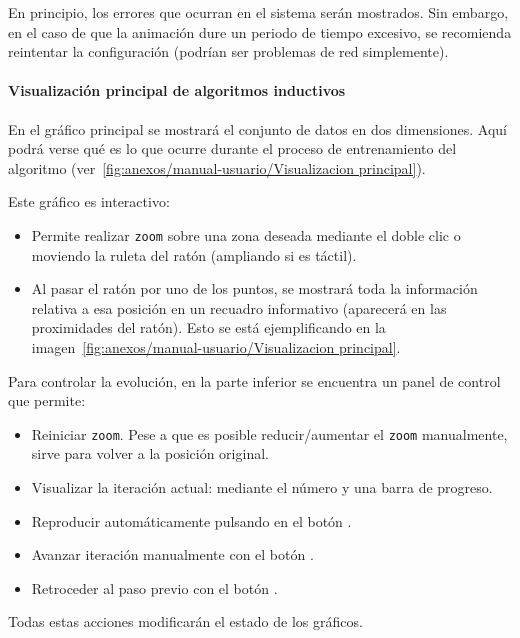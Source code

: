 En principio, los errores que ocurran en el sistema serán mostrados. Sin embargo, en el caso de que la animación dure un periodo de tiempo excesivo, se recomienda reintentar la configuración (podrían ser problemas de red simplemente).

\paragraph{Visualización principal de algoritmos inductivos} En el gráfico principal se mostrará el conjunto de datos en dos dimensiones. Aquí podrá verse qué es lo que ocurre durante el proceso de entrenamiento del algoritmo (ver~\ref{fig:anexos/manual-usuario/Visualizacion principal}).


Este gráfico es interactivo:
\begin{itemize}
    \item Permite realizar \texttt{zoom} sobre una zona deseada mediante el doble clic o moviendo la ruleta del ratón (ampliando si es táctil).
 	\item Al pasar el ratón por uno de los puntos, se mostrará toda la información relativa a esa posición en un recuadro informativo (aparecerá en las proximidades del ratón). Esto se está ejemplificando en la imagen~\ref{fig:anexos/manual-usuario/Visualizacion principal}.
\end{itemize}

Para controlar la evolución, en la parte inferior se encuentra un panel de
control que permite:
\begin{itemize}
    \item Reiniciar \texttt{zoom}. Pese a que es posible reducir/aumentar el
    \texttt{zoom} manualmente, sirve para volver a la posición original.
    \item Visualizar la iteración actual: mediante el número y una barra de
    progreso.
    \item Reproducir automáticamente pulsando en el botón \button{$\blacktriangleright$}.
    \item Avanzar iteración manualmente con el botón \button{$\gg$}.
    \item Retroceder al paso previo con el botón  \button{$\ll$}.
\end{itemize}

Todas estas acciones modificarán el estado de los gráficos.

